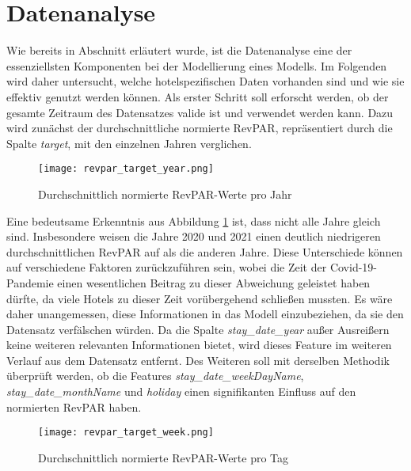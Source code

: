 \section{Datenanalyse}
\label{subsec:revpar_analyse}

Wie bereits in Abschnitt \emph{} erläutert wurde, ist die Datenanalyse eine der essenziellsten Komponenten bei der Modellierung eines Modells. Im Folgenden wird daher untersucht, welche hotelspezifischen Daten vorhanden sind und wie sie effektiv genutzt werden können.
\newline
\newline
Als erster Schritt soll erforscht werden, ob der gesamte Zeitraum des Datensatzes valide ist und verwendet werden kann. Dazu wird zunächst der durchschnittliche normierte RevPAR, repräsentiert durch die Spalte \emph{target}, mit den einzelnen Jahren verglichen.

\begin{figure}[h]
    \centering
    \texttt{[image: revpar\_target\_year.png]}
    \caption[Durchschnittlich normierte RevPAR-Werte pro Jahr]{Durchschnittlich normierte RevPAR-Werte pro Jahr}
    \label{img:revpar_target_year}
\end{figure}

Eine bedeutsame Erkenntnis aus Abbildung \ref{img:revpar_target_year} ist, dass nicht alle Jahre gleich sind. Insbesondere weisen die Jahre 2020 und 2021 einen deutlich niedrigeren durchschnittlichen RevPAR auf als die anderen Jahre. Diese Unterschiede können auf verschiedene Faktoren zurückzuführen sein, wobei die Zeit der Covid-19-Pandemie einen wesentlichen Beitrag zu dieser Abweichung geleistet haben dürfte, da viele Hotels zu dieser Zeit vorübergehend schließen mussten. Es wäre daher unangemessen, diese Informationen in das Modell einzubeziehen, da sie den Datensatz verfälschen würden. Da die Spalte 
\emph{stay\_date\_year} außer Ausreißern keine weiteren relevanten Informationen bietet, wird dieses Feature im weiteren Verlauf aus dem Datensatz entfernt.
\newline
\newline
Des Weiteren soll mit derselben Methodik überprüft werden, ob die Features
\newline 
\emph{stay\_date\_weekDayName}, \emph{stay\_date\_monthName} und \emph{holiday} einen signifikanten Einfluss auf den normierten RevPAR haben.

\begin{figure}[h]
    \centering
    \texttt{[image: revpar\_target\_week.png]}
    \caption[Durchschnittlich normierte RevPAR-Werte pro Tag]{Durchschnittlich normierte RevPAR-Werte pro Tag}
    \label{img:revpar_target_week}
\end{figure}

